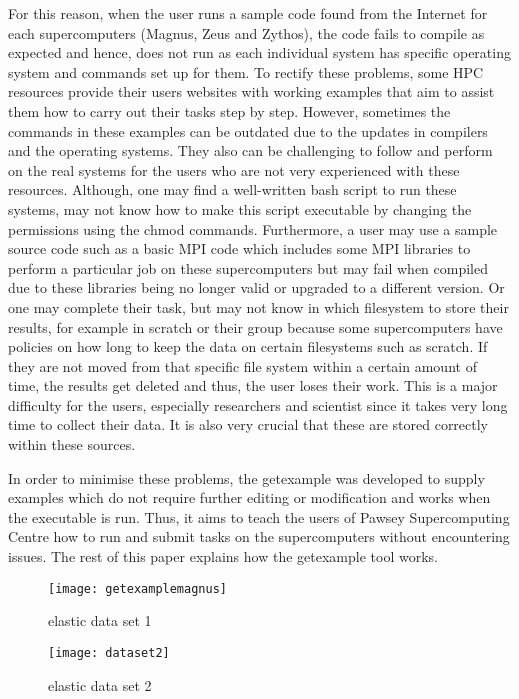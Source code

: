 For this reason, when the user runs a sample code found from the Internet for each supercomputers (Magnus, Zeus and Zythos), the code fails to compile 
as expected and hence, does not run as each individual system has specific operating system and commands set up for them. To rectify these problems, 
some HPC resources provide their users websites with working examples that aim to assist them how to carry out their tasks step by step. 
However, sometimes the commands in these examples can be outdated due to the updates in compilers and the operating systems. They also can be challenging 
to follow and perform on the real systems for the users who are not very experienced with these resources. Although, one may find a well-written bash 
script to run these systems, may not know how to make this script executable by changing the permissions using the chmod commands. Furthermore, a user 
may use a sample source code such as a basic MPI code which includes some MPI libraries to perform a particular job on these supercomputers but may 
fail when compiled due to these libraries being no longer valid or upgraded to a different version. Or one may complete their task, but may 
not know in which filesystem to store their results, for example in scratch or their group because some supercomputers have policies on how long to keep 
the data on certain filesystems such as scratch. If they are not moved from that specific file system within a certain amount of time, the results get 
deleted and thus, the user loses their work. This is a major difficulty for the users, especially researchers and scientist since it takes very long time 
to collect their data. It is also very crucial that these are stored correctly within these sources.

In order to minimise these problems, the getexample was developed to supply examples which do not require further editing or modification and works
when the executable is run. Thus, it aims to teach the users of Pawsey Supercomputing Centre how to run and submit tasks on the supercomputers without 
encountering issues. The rest of this paper explains how the getexample tool works.   

\begin{figure}[!ht]
\begin{center}
\texttt{[image: getexamplemagnus]}
\caption{elastic data set 1}
\label{dataset1}
\end{center}
\end{figure} 

\begin{figure}[!hb]
\begin{center}
\texttt{[image: dataset2]}
\caption{elastic data set 2}
\label{dataset2}
\end{center}
\end{figure} 


